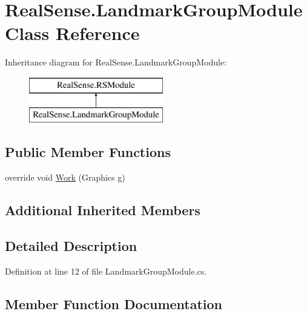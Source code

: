 \hypertarget{class_real_sense_1_1_landmark_group_module}{}\section{Real\+Sense.\+Landmark\+Group\+Module Class Reference}
\label{class_real_sense_1_1_landmark_group_module}
Inheritance diagram for Real\+Sense.\+Landmark\+Group\+Module\+:\begin{figure}[H]
\begin{center}
\leavevmode
\includegraphics[height=2.000000cm]{class_real_sense_1_1_landmark_group_module}
\end{center}
\end{figure}
\subsection*{Public Member Functions}
\begin{DoxyCompactItemize}
\item 
override void \hyperlink{class_real_sense_1_1_landmark_group_module_aae68525cdcf843719e02fa9b7317d3fa}{Work} (Graphics g)
\end{DoxyCompactItemize}
\subsection*{Additional Inherited Members}


\subsection{Detailed Description}


Definition at line 12 of file Landmark\+Group\+Module.\+cs.



\subsection{Member Function Documentation}
\mbox{\label{class_real_sense_1_1_landmark_group_module_aae68525cdcf843719e02fa9b7317d3fa}} 
